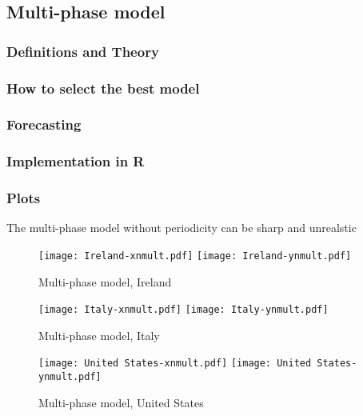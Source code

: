 \subsection{Multi-phase model}

\subsubsection{Definitions and Theory}

\subsubsection{How to select the best model}

\subsubsection{Forecasting}

\subsubsection{Implementation in R}

\subsubsection{Plots}

The multi-phase model without periodicity can be sharp and unrealstic

\begin{figure}[H]
  \texttt{[image: Ireland-xnmult.pdf]} \label{fig:ireland-xnmult}
\endminipage\hfill
{}
  \texttt{[image: Ireland-ynmult.pdf]} \label{fig:ireland-ynmult}
\endminipage
\caption{Multi-phase model, Ireland}
\end{figure}

\begin{figure}[H]
  \texttt{[image: Italy-xnmult.pdf]} \label{fig:italy-xnmult}
\endminipage\hfill
{}
  \texttt{[image: Italy-ynmult.pdf]} \label{fig:italy-ynmult}
\endminipage
\caption{Multi-phase model, Italy}
\end{figure}

\begin{figure}[H]
  \texttt{[image: United States-xnmult.pdf]} \label{fig:usa-xnmult}
\endminipage\hfill
{}
  \texttt{[image: United States-ynmult.pdf]} \label{fig:usa-ynmult}
\endminipage
\caption{Multi-phase model, United States}
\end{figure}


